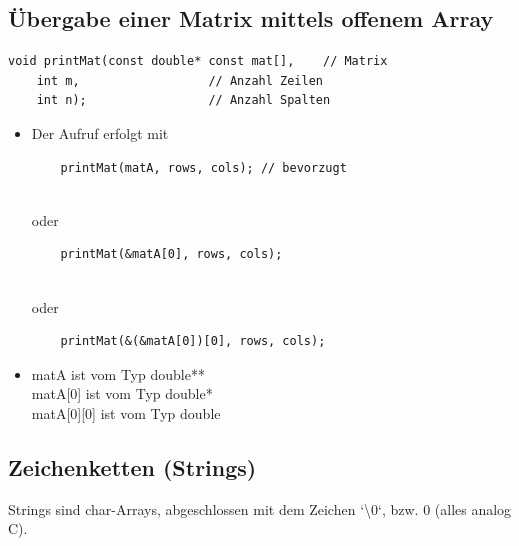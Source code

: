 \subsection{Übergabe einer Matrix mittels offenem Array}
\noindent
\begin{minipage}{\linewidth}
\begin{lstlisting}
void printMat(const double* const mat[],	// Matrix
	int m,					// Anzahl Zeilen
	int n);					// Anzahl Spalten
\end{lstlisting}
\end{minipage}

\begin{itemize}
	\item Der Aufruf erfolgt mit\\
	\vspace{-\baselineskip}
	\begin{minipage}{0.6\linewidth}
	\begin{lstlisting}
	printMat(matA, rows, cols); // bevorzugt
	\end{lstlisting}
	\end{minipage}\\
	oder\\
	\vspace{-\baselineskip}
	\begin{minipage}{0.6\linewidth}
	\begin{lstlisting}
	printMat(&matA[0], rows, cols);
	\end{lstlisting}
	\end{minipage}\\
	oder\\
	\vspace{-\baselineskip}
	\begin{minipage}{0.6\linewidth}
	\begin{lstlisting}
	printMat(&(&matA[0])[0], rows, cols);
	\end{lstlisting}
	\end{minipage}
	\item matA \hspace{1cm} ist vom Typ double**\\
	matA[0] \hspace{6mm} ist vom Typ double*\\
	matA[0][0] \hspace{2mm} ist vom Typ double
\end{itemize}

\subsection{Zeichenketten (Strings)}
Strings sind char-Arrays, abgeschlossen mit dem Zeichen `\textbackslash0`, bzw. 0 (alles analog C).

